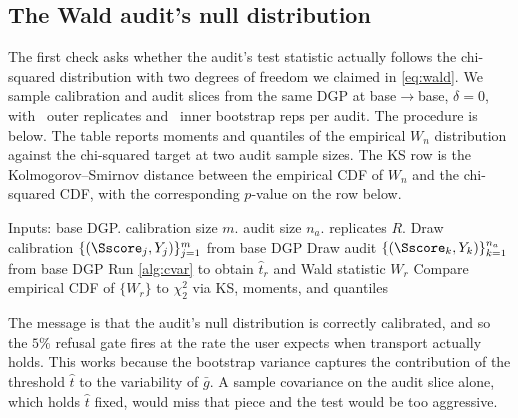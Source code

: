 \documentclass[11pt]{article}
\begin{document}
\subsection{The Wald audit's null distribution}
\label{app:wald-mc}

The first check asks whether the audit's test statistic actually follows the chi-squared distribution with two degrees of freedom we claimed in \cref{eq:wald}. We sample calibration and audit slices from the same DGP at base$\to$base, $\delta = 0$, with \waldNumOuter\ outer replicates and \waldNumInner\ inner bootstrap reps per audit. The procedure is below. The table reports moments and quantiles of the empirical $W_n$ distribution against the chi-squared target at two audit sample sizes. The KS row is the Kolmogorov--Smirnov distance between the empirical CDF of $W_n$ and the chi-squared CDF, with the corresponding $p$-value on the row below.

\begin{algorithm}[H]
\caption{Wald audit calibration MC at base$\to$base, $\delta = 0$.}
\label{alg:wald-mc}
\begin{algorithmic}[1]
\Statex Inputs: base DGP. calibration size $m$. audit size $n_a$. replicates $R$.
  \State Draw calibration $\{(\Sscore_j, Y_j)\}_{j=1}^{m}$ from base DGP
  \State Draw audit $\{(\Sscore_k, Y_k)\}_{k=1}^{n_a}$ from base DGP
  \State Run \cref{alg:cvar} to obtain $\hat t_r$ and Wald statistic $W_r$
\EndFor
\State Compare empirical CDF of $\{W_r\}$ to $\chi^2_2$ via KS, moments, and quantiles
\end{algorithmic}
\end{algorithm}

The message is that the audit's null distribution is correctly calibrated, and so the $5\%$ refusal gate fires at the rate the user expects when transport actually holds. This works because the bootstrap variance captures the contribution of the threshold $\hat t$ to the variability of $\bar g$. A sample covariance on the audit slice alone, which holds $\hat t$ fixed, would miss that piece and the test would be too aggressive.
\end{document}
